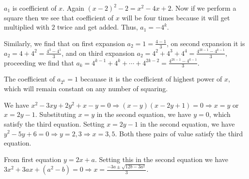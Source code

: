   $a_1$ is coefficient of $x$. Again $(x - 2)^2 - 2= x^2 - 4x + 2$. Now if we perform a square then we see
  that coefficient of $x$ will be four times because it will get multiplied with $2$ twice and get
  added. Thus, $a_1 = -4^k$.

  Similarly, we find that on first expansion $a_2 = 1 = \frac{4 - 1}{3}$, on second expansion it is $a_2 =
  4 + 4^2 = \frac{4^3 - 4^1}{3}$, and on third expansion $a_2 = 4^2 + 4^3 + 4^4 = \frac{4^{2k
      - 1} - 4^{k - 1}}{3}$, proceeding we find that $a_k = 4^{k-1} + 4^{k} + \cdots + 4^{2k - 2} =
  \frac{4^{2k - 1} - 4^{k - 1}}{3}$.

  The coefficient of $a_{2^k} = 1$ becauase it is the coefficient of highest power of $x$, which will remain
  constant on any number of squaring.
\item We have $x^2 - 3xy + 2y^2 + x - y = 0 \Rightarrow (x - y)(x - 2y + 1) = 0\Rightarrow x = y$ or $x = 2y
  - 1$. Substituting $x = y$ in the second equation, we have $y = 0$, which satisfy the third
  equation. Setting  $x = 2y - 1$ in the second equation, we have $y^2 - 5y + 6 = 0 \Rightarrow y = 2,3
  \Rightarrow x = 3, 5$. Both these pairs of value satisfy the third equation.
\item From first equation $y = 2x + a$. Setting this in the second equation we have $3x^2 + 3ax + (a^2 - b)
  = 0 \Rightarrow x = \frac{-3a \pm\sqrt{12b - 3a^2}}{3}$.

